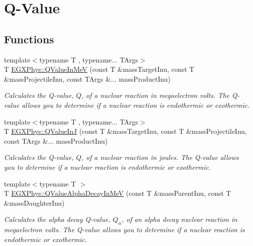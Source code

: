\hypertarget{group___e_g_x_phys-_q_value}{}\section{Q-\/\+Value}
\label{group___e_g_x_phys-_q_value}
\subsection*{Functions}
\begin{DoxyCompactItemize}
\item 
{\footnotesize template$<$typename T , typename... T\+Args$>$ }\\T \hyperlink{group___e_g_x_phys-_q_value_ga40937601d7aa0aac2a7ca005ef2d2a8b}{E\+G\+X\+Phys\+::\+Q\+Value\+In\+MeV} (const T \&mass\+Target\+Inu, const T \&mass\+Projectile\+Inu, const T\+Args \&... mass\+Product\+Inu)
\begin{DoxyCompactList}\small\item\em Calculates the Q-\/value, $Q$, of a nuclear reaction in megaelectron volts. The Q-\/value allows you to determine if a nuclear reaction is endothermic or exothermic. \end{DoxyCompactList}\item 
{\footnotesize template$<$typename T , typename... T\+Args$>$ }\\T \hyperlink{group___e_g_x_phys-_q_value_ga377e1e8298a32359ac68025fb1dd8151}{E\+G\+X\+Phys\+::\+Q\+Value\+InJ} (const T \&mass\+Target\+Inu, const T \&mass\+Projectile\+Inu, const T\+Args \&... mass\+Product\+Inu)
\begin{DoxyCompactList}\small\item\em Calculates the Q-\/value, $Q$, of a nuclear reaction in joules. The Q-\/value allows you to determine if a nuclear reaction is endothermic or exothermic. \end{DoxyCompactList}\item 
{\footnotesize template$<$typename T $>$ }\\T \hyperlink{group___e_g_x_phys-_q_value_ga18e054c21cd5f87744e9f5aadc959a54}{E\+G\+X\+Phys\+::\+Q\+Value\+Alpha\+Decay\+In\+MeV} (const T \&mass\+Parent\+Inu, const T \&mass\+Daughter\+Inu)
\begin{DoxyCompactList}\small\item\em Calculates the alpha decay Q-\/value, $Q_{\alpha}$, of an alpha decay nuclear reaction in megaelectron volts. The Q-\/value allows you to determine if a nuclear reaction is endothermic or exothermic. \end{DoxyCompactList}\item 

\end{DoxyCompactItemize}
